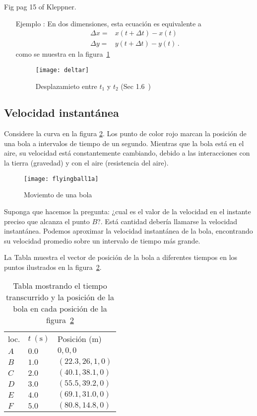 \begin{inprogress}
  Fig pag 15 of Kleppner.
\end{inprogress}

\begin{itemize}
\item[Ejemplo]: En dos dimensiones, esta ecuaci\'on es equivalente a
  \begin{align}
    \Delta x=&x(t+\Delta t)-x(t)\nonumber\\
    \Delta y=&y(t+\Delta t)-y(t)\,.
  \end{align}
  como se muestra en la figura~\ref{fig:deltar}
  \begin{figure}
    \centering
    \texttt{[image: deltar]}
    \caption{Desplazamieto entre $t_1$ y $t_2$ (Sec 1.6~\cite{Kleppner})}
    \label{fig:deltar}
  \end{figure}

\end{itemize}

\subsection{Velocidad instantánea}

Considere la curva en la figura \ref{fig:flyingball1a}. Los punto de color rojo marcan la posición de una bola a intervalos de tiempo de un segundo. Mientras que la bola está en el aire, su velocidad está constantemente cambiando, debido a las interacciones con la tierra (gravedad) y con el aire (resistencia del aire). 
\begin{figure}
  \centering
  \texttt{[image: flyingball1a]}
  \caption{Moviemto de una bola}
  \label{fig:flyingball1a}
\end{figure}

Suponga que hacemos la pregunta: ¿cual es el valor de la velocidad en el instante preciso que alcanza el punto $B$?. Está cantidad debería llamarse la velocidad instantánea. Podemos aproximar la velocidad instantánea de la bola, encontrando su velocidad promedio sobre un intervalo de tiempo más grande. 

La Tabla muestra el vector de posición de la bola a diferentes tiempos en los puntos ilustrados en la figura~\ref{fig:flyingball1a}.

\begin{table}
  \centering
  \begin{tabular}{|l|l|l|}
    loc. & $t\ (\text{s})$ & Posición (m)\\
    $A$ & $0.0$ &$0,0,0$ \\
    $B$ & $1.0$ &$(22.3,26,1,0)$ \\
    $C$ & $2.0$ &$(40.1,38.1,0)$ \\
    $D$ & $3.0$ &$(55.5,39.2,0)$ \\
    $E$ & $4.0$ &$(69.1,31.0,0)$ \\
    $F$ & $5.0$ &$(80.8,14.8,0)$ \\
  \end{tabular}
  \caption{Tabla mostrando el tiempo transcurrido y la posición de la bola en cada posición de la figura~\ref{fig:flyingball1a}}
  \label{tab:flyingball1a}
\end{table}

